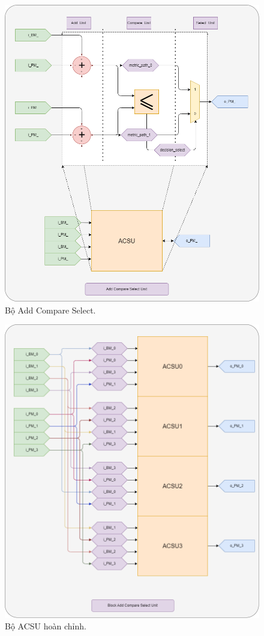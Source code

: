 \begin{figure}[H]
	\centering
	\includegraphics[width=.8\linewidth]{sections/pic/mophongbangSystemVerilog/ACS.png}
	\caption{Bộ Add Compare Select.}
\end{figure}

\begin{figure}[H]
	\centering
	\includegraphics[width=.8\linewidth]{sections/pic/mophongbangSystemVerilog/ACSU.png}
	\caption{Bộ ACSU hoàn chỉnh.}
\end{figure}

